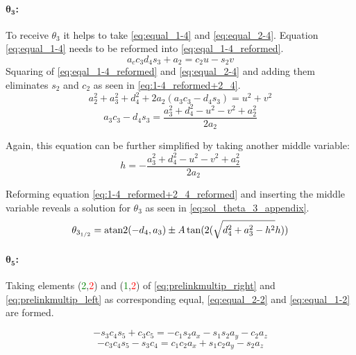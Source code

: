 \paragraph{$\pmb{\theta_3}$:}

To receive $\theta_3$ it helps to take  \ref{eq:equal_1-4} and \ref{eq:equal_2-4}. Equation \ref{eq:equal_1-4} needs to be reformed into \ref{eq:eqal_1-4_reformed}.
\begin{equation} \label{eq:eqal_1-4_reformed}
a_c c_3 d_4 s_3 + a_2 = c_2 u -s_2 v
\end{equation}
Squaring of \ref{eq:eqal_1-4_reformed} and \ref{eq:equal_2-4} and adding them eliminates $s_2$ and $c_2$ as seen in \ref{eq:1-4_reformed+2_4}.
\begin{equation}\label{eq:1-4_reformed+2_4}
a_2^2 + a_3^2 +d_4^2 + 2 a_2(a_3 c_3 -d_4 s_3) = u^2 + v^2
\end{equation}
\begin{equation}\label{eq:1-4_reformed+2_4_reformed}
a_3 c_3 - d_4 s_3 = \frac{a_3^2 + d_4^2 - u^2 -v^2 +a_2^2}{2a_2}
\end{equation}

Again, this equation can be further simplified by taking another middle variable:
\begin{equation*}
h=-\frac{a_3^2 + d_4^2 - u^2 -v^2 + a_2^2}{2a_2}
\end{equation*}

Reforming equation \ref{eq:1-4_reformed+2_4_reformed} and inserting the middle variable reveals a solution for $\theta_3$ as seen in \cref{eq:sol_theta_3_appendix}.
\begin{equation}\label{eq:sol_theta_3_appendix}
\theta_{3_{1/2}} = \operatorname{atan2}(-d_4 , a_3) \pm A \tan (2 (\sqrt{d_4^2 +a_3^2 -h^2}  h))
\end{equation}


\paragraph{$\pmb{\theta_5}$:}
Taking elements (\textcolor{green}{2},\textcolor{red}{2}) and (\textcolor{green}{1},\textcolor{red}{2}) of  \ref{eq:prelinkmultip_right} and \ref{eq:prelinkmultip_left} as corresponding equal,  \ref{eq:equal_2-2} and \ref{eq:equal_1-2} are formed.

\begin{equation}\label{eq:equal_2-2}
-s_3 c_4 s_5 + c_3 c_5 = -c_1 s_2 a_x - s_1 s_2 a_y -c_2 a_z
\end{equation}
\begin{equation}\label{eq:equal_1-2}
-c_3 c_4 s_5 - s_3 c_4 = c_1 c_2 a_x + s_1 c_2 a_y - s_2 a_z
\end{equation}

